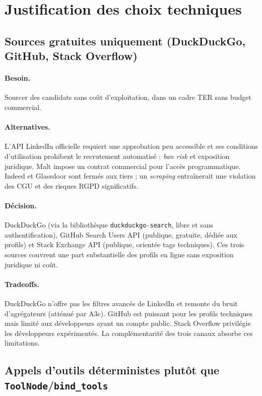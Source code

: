 \section{Justification des choix techniques}

\subsection{Sources gratuites uniquement (DuckDuckGo, GitHub, Stack Overflow)}

\paragraph{Besoin.} Sourcer des candidats sans coût d'exploitation, dans un cadre TER sans budget commercial.

\paragraph{Alternatives.} L'API LinkedIn officielle requiert une approbation peu accessible et ses conditions d'utilisation prohibent le recrutement automatisé : \textit{ban risk} et exposition juridique. Malt impose un contrat commercial pour l'accès programmatique. Indeed et Glassdoor sont fermés aux tiers ; un \textit{scraping} entraînerait une violation des CGU et des risques RGPD significatifs.

\paragraph{Décision.} DuckDuckGo (via la bibliothèque \texttt{duckduckgo-search}, libre et sans authentification), GitHub Search Users API (publique, gratuite, dédiée aux profils) et Stack Exchange API (publique, orientée tags techniques). Ces trois sources couvrent une part substantielle des profils en ligne sans exposition juridique ni coût.

\paragraph{Tradeoffs.} DuckDuckGo n'offre pas les filtres avancés de LinkedIn et remonte du bruit d'agrégateurs (atténué par A3c). GitHub est puissant pour les profils techniques mais limité aux développeurs ayant un compte public. Stack Overflow privilégie les développeurs expérimentés. La complémentarité des trois canaux absorbe ces limitations.

\subsection{Appels d'outils déterministes plutôt que \texttt{ToolNode}/\texttt{bind\_tools}}

